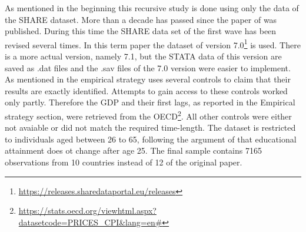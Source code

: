 \documentclass[12pt,a4paper]{article}
\let\rmarkdownfootnote\footnote%
\def\footnote{\protect\rmarkdownfootnote}
\begin{document}
As mentioned in the beginning this recursive study is done using only
the data of the SHARE dataset. More than a decade has passed since the
paper of \textcite{brunello} was published. During this time the SHARE
data set of the first wave has been revised several times. In this term
paper the dataset of version 7.0\footnote{\url{https://releases.sharedataportal.eu/releases}}
is used. There is a more actual version, namely 7.1, but the STATA data
of this version are saved as .dat files and the .sav files of the 7.0
version were easier to implement. As mentioned in the empirical strategy
\textcite{brunello} uses several controls to claim that their results
are exactly identified. Attempts to gain access to these controls worked
only partly. Therefore the GDP and their first lags, as reported in the
Empirical strategy section, were retrieved from the OECD\footnote{\url{https://stats.oecd.org/viewhtml.aspx?datasetcode=PRICES_CPI\&lang=en\#}}.
All other controls were either not avaiable or did not match the
required time-length. The dataset is restricted to individuals aged
between 26 to 65, following the argument of \textcite{brunello} that
educational attainment does ot change after age 25. The final sample
contains 7165 observations from 10 countries instead of 12 of the
original paper.

\newcommand{\range}[1]{\eqparbox{ra}{#1}}
\end{document}

